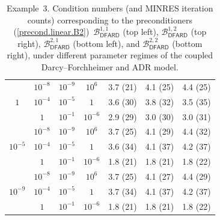 \documentclass[11pt, reqno, a4paper, twoside]{article}
\newcommand{\rF}{\mathtt{F}}
\numberwithin{equation}{section}
\numberwithin{remark}{section}
\numberwithin{figure}{section}
\numberwithin{table}{section}
\begin{document}
\begin{table}[t]
{\begin{minipage}{0.48\textwidth}
\begin{tabular}{|c |c|c| c|lll|}
\multirow{3}{*}{$1$}
& $10^{-8}$ & $10^{-9}$ & $10^{6}$ & 3.7 (21) & 4.1 (25)& 4.4 (25) \\
& $10^{-4}$ & $10^{-5}$ & $1$ & 3.6 (30)& 3.8 (32) & 3.5 (35)\\
& $1$ & $10^{-1}$ & $10^{-6}$ &2.9 (29) &3.0 (30) &3.0 (31) \\
\hline

\multirow{3}{*}{$10^{-5}$}
& $10^{-8}$ & $10^{-9}$ & $10^{6}$ & 3.7 (25) &4.1 (29) &4.4 (32) \\
& $10^{-4}$ & $10^{-5}$ & $1$ &3.6 (34) &4.1 (37) &4.2 (37) \\
& $1$ & $10^{-1}$ & $10^{-6}$ &1.8 (21) &1.8 (21) & 1.8 (22) \\
\hline

\multirow{3}{*}{$10^{-9}$}
& $10^{-8}$ & $10^{-9}$ & $10^{6}$ & 3.7 (25)&4.1 (27) &4.4 (29) \\
& $10^{-4}$ & $10^{-5}$ & $1$ &3.7 (34) &4.1 (37) &4.2 (37) \\
& $1$ & $10^{-1}$ & $10^{-6}$ &1.8 (21) &1.8 (21) &1.8 (22) \\
\hline
\end{tabular}
\end{minipage}}
\vspace{0.5cm}
\caption{{Example~3. Condition numbers (and MINRES iteration counts) corresponding to the preconditioners (\eqref{precond.linear.B2})~$\mathcal{B}^{1,1}_{\mathsf{DFARD}}$ (top left), $\mathcal{B}^{1,2}_{\mathsf{DFARD}}$ (top right), $\mathcal{B}^{2,1}_{\mathsf{DFARD}}$ (bottom left), and $\mathcal{B}^{2,2}_{\mathsf{DFARD}}$ (bottom right), under different parameter regimes of the coupled Darcy--Forchheimer and ADR model.}}
\label{tab:DF-ARD-Prec}
\end{table}


\end{document}
